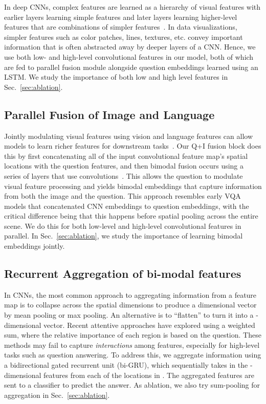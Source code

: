 \documentclass[10pt,twocolumn]{article}
\begin{document}
In deep CNNs, complex features are learned as a hierarchy of visual features with earlier layers learning simple features and later layers learning higher-level features that are combinations of simpler features~\cite{yosinski2015understanding}. In data visualizations, simpler features such as color patches, lines, textures, etc. convey important information that is often abstracted away by deeper layers of a CNN. Hence, we use both low- and high-level convolutional features in our model, both of which are fed to parallel fusion module alongside question embeddings learned using an LSTM. We study the importance of both low and high level features in Sec.~\ref{sec:ablation}.

\subsection{Parallel Fusion of Image and Language} Jointly modulating visual features using  vision and language features can allow models to learn richer features for downstream tasks~\cite{malinowski2018visual,perez2018film,shrestha2019ramen}. Our Q+I fusion block does this by first concatenating all of the input convolutional feature map's spatial locations with the question features, and then bimodal fusion occurs using a series of layers that use   convolutions~\cite{malinowski2018visual,shrestha2019ramen}. This allows the question to modulate visual feature processing and yields bimodal embeddings that capture information from both the image and the question. This approach resembles early VQA models that concatenated CNN embeddings to question embeddings, with the critical difference being that this happens before spatial pooling across the entire scene. We do this for both low-level and high-level convolutional features in parallel. In Sec.~\ref{sec:ablation}, we study the importance of learning bimodal embeddings jointly. 

\subsection{Recurrent Aggregation of bi-modal features} 
 In CNNs, the most common approach to aggregating information from a feature map  is to collapse across the spatial dimensions to produce a  dimensional vector by mean pooling or max pooling. An alternative is to ``flatten''  to turn it into a -dimensional vector. Recent attentive approaches have  explored using a weighted sum, where the relative importance of each region is based on the question. These methods may fail to  capture \textit{interactions} among features, especially for high-level tasks such as question answering. To address this, we aggregate information using a bidirectional gated recurrent unit (bi-GRU), which sequentially takes in the -dimensional features from each of the  locations in . The aggregated features are sent to a classifier to predict the answer. As ablation, we also try sum-pooling for aggregation in Sec.~\ref{sec:ablation}.
\end{document}
